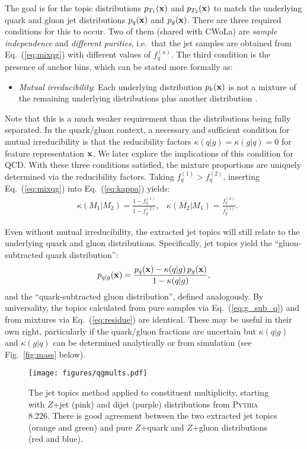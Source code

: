 \documentclass[aps,prl,floatfix,preprintnumbers,twocolumn,groupedaddress,nofootinbib,longbibliography]{revtex4-1}
\DeclareRobustCommand{\Fig}[1]{Fig.~\ref{#1}}
\DeclareRobustCommand{\Eq}[1]{Eq.~(\ref{#1})}
\begin{document}
The goal is for the topic distributions $p_{T_1}({\bf x})$ and $p_{T_2}({\bf x})$ to match the underlying quark and gluon jet distributions $p_q({\bf x})$ and $p_g({\bf x})$.
%
There are three required conditions for this to occur. 
%
Two of them (shared with CWoLa) are \emph{sample independence} and \emph{different purities}, i.e.\ that the jet samples are obtained from \Eq{eq:mixqg} with different values of $f_q^{(a)}$.
%
The third condition is the presence of anchor bins, which can be stated more formally as:
%
\begin{itemize}[leftmargin=*]
\item[]\emph{Mutual irreducibility}: Each underlying distribution $p_k({\bf x})$ is not a mixture of the remaining underlying distributions plus another distribution \cite{blanchard2016classification}.
\end{itemize}
%
Note that this is a much weaker requirement than the distributions being fully separated.
%
In the quark/gluon context, a necessary and sufficient condition for mutual irreducibility is that the reducibility factors $\kappa(q|g) = \kappa(g|q) = 0$ for feature representation ${\bf x}$.
%
We later explore the implications of this condition for QCD.
%
With these three conditions satisfied, the mixture proportions are uniquely determined via the reducibility factors.
%
Taking $f_q^{(1)}>f_q^{(2)}$, inserting \Eq{eq:mixqg} into \Eq{eq:kappa} yields:
%
\begin{align}
&\kappa(M_1|M_2) = \frac{1 - f_q^{(1)}}{1 - f_q^{(2)}},  &\kappa(M_2|M_1) =  \frac{f_q^{(2)}}{f_q^{(1)}}.
\end{align}


Even without mutual irreducibility, the extracted jet topics will still relate to the underlying quark and gluon distributions.
%
Specifically, jet topics yield the ``gluon-subtracted quark distribution'':
%
\begin{align}
\label{eq:g_sub_q}
p_{q|g}({\bf x}) = \frac{p_q({\bf x}) - \kappa(q|g) \, p_g({\bf x})}{1 - \kappa(q|g)},
\end{align}
%
and the ``quark-subtracted gluon distribution'', defined analogously.
%
By universality, the topics calculated from pure samples via \Eq{eq:g_sub_q} and from mixtures via \Eq{eq:residue} are identical.
%
These may be useful in their own right, particularly if the quark/gluon fractions are uncertain but $\kappa(q|g)$ and $\kappa(g|q)$ can be determined analytically or from simulation (see \Fig{fig:mass} below).


\begin{figure}[t]
\centering
\texttt{[image: figures/qgmults.pdf]}
\caption{The jet topics method applied to constituent multiplicity, starting with $Z$+jet (pink) and dijet (purple) distributions from \textsc{Pythia 8.226}.
%
There is good agreement between the two extracted jet topics (orange and green) and pure $Z$+quark and $Z$+gluon distributions (red and blue).}
\label{fig:jethists}
\end{figure}
\end{document}
